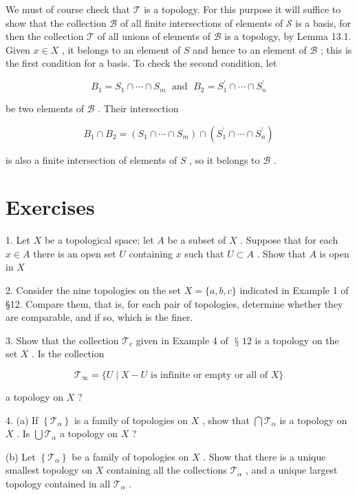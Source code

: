 \documentclass[10pt]{article}
\begin{document}
We must of course check that \(\mathcal{T}\) is a topology. For this purpose it will suffice to show that the collection \(\mathcal{B}\) of all finite intersections of elements of \(\mathcal{S}\) is a basis, for then the collection \(\mathcal{T}\) of all unions of elements of \(\mathcal{B}\) is a topology, by Lemma 13.1. Given \(x \in  X\) , it belongs to an element of \(S\) and hence to an element of \(\mathcal{B}\) ; this is the first condition for a basis. To check the second condition, let

\[
{B}_{1} = {S}_{1} \cap  \cdots  \cap  {S}_{m}\;\text{ and }\;{B}_{2} = {S}_{1}^{\prime } \cap  \cdots  \cap  {S}_{n}^{\prime }
\]

be two elements of \(\mathcal{B}\) . Their intersection

\[
{B}_{1} \cap  {B}_{2} = \left( {{S}_{1} \cap  \cdots  \cap  {S}_{m}}\right)  \cap  \left( {{S}_{1}^{\prime } \cap  \cdots  \cap  {S}_{n}^{\prime }}\right)
\]

is also a finite intersection of elements of \(S\) , so it belongs to \(\mathcal{B}\) .

\section*{Exercises}

1. Let \(X\) be a topological space; let \(A\) be a subset of \(X\) . Suppose that for each \(x \in  A\) there is an open set \(U\) containing \(x\) such that \(U \subset  A\) . Show that \(A\) is open in \(X\)

2. Consider the nine topologies on the set \(X = \{ a,b,c\}\) indicated in Example 1 of §12. Compare them, that is, for each pair of topologies, determine whether they are comparable, and if so, which is the finer.

3. Show that the collection \({\mathcal{T}}_{c}\) given in Example 4 of \(\text{ § }{12}\) is a topology on the set \(X\) . Is the collection

\[
{\mathcal{T}}_{\infty } = \{ U \mid  X - U\text{ is infinite or empty or all of }X\}
\]

a topology on \(X\) ?

4. (a) If \(\left\{  {\mathcal{T}}_{\alpha }\right\}\) is a family of topologies on \(X\) , show that \(\bigcap {\mathcal{T}}_{\alpha }\) is a topology on \(X\) . Is \(\bigcup {\mathcal{T}}_{\alpha }\) a topology on \(X\) ?

(b) Let \(\left\{  {\mathcal{T}}_{\alpha }\right\}\) be a family of topologies on \(X\) . Show that there is a unique smallest topology on \(X\) containing all the collections \({\mathcal{T}}_{\alpha }\) , and a unique largest topology contained in all \({\mathcal{T}}_{\alpha }\) .
\end{document}
